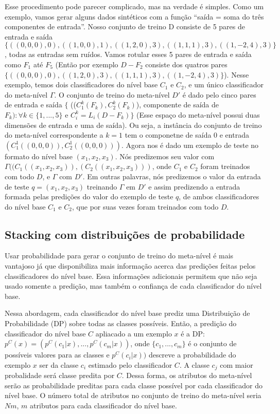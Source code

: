 \documentclass[]{article}
\begin{document}
Esse procedimento pode parecer complicado, mas na verdade é simples.
Como um exemplo, vamos gerar alguns dados sintéticos com a função
``saída = soma do três componentes de entrada''. Nosso conjunto de
treino D consiste de 5 pares de entrada e saída
\(\{((0,0,0),0), ((1,0,0),1), ((1,2,0),3), ((1,1,1),3), ((1,-2,4),3)\}\),
todas as entradas sem ruídos. Vamos rotular esses 5 pares de entrada e
saída como \(F_1\) até \(F_5\) (Então por exemplo \(D - F_2\) consiste
dos quatros pares
\(\{((0,0,0),0), ((1,2,0),3), ((1,1,1),3), ((1,-2,4),3)\}\)). Nesse
exemplo, temos dois classificadores do nível base \(C_1\) e \(C_2\), e
um único classificador do meta-nível \(\Gamma\). O conjunto de treino do
meta-nível \(D'\) é dado pelo cinco pares de entrada e saída \(\{\)
((\(C_1^k(F_k), C_2^k(F_k)\)), componente de saída de
\(F_k) : \forall k \in \{1,...,5\}\) e \(C_i^k = L_i(D-F_k)\}\) (Esse
espaço do meta-nível possui duas dimensões de entrada e uma de saída).
Ou seja, a instância do conjunto de treino do meta-nível correspondente
a \(k = 1\) tem o componetne de saída 0 e entrada
\((C_1^1((0,0,0)), C_2^1((0,0,0)))\). Agora nos é dado um exemplo de
teste no formato do nível base \((x_1, x_2, x_3)\). Nós predizemos seu
valor com \(\Gamma((C_1((x_1, x_2, x_3)), (C_2((x_1, x_2, x_3)))\), onde
\(C_1\) e \(C_2\) foram treinados com todo \(D\), e \(\Gamma\) com
\(D'\). Em outras palavras, nós predizemos o valor da entrada de teste
\(q = (x_1, x_2, x_3)\) treinando \(\Gamma\) em \(D'\) e assim
predizendo a entrada formada pelas predições do valor do exemplo de
teste \(q\), de ambos classificadores do nível base \(C_1\) e \(C_2\),
que por suas vezes foram treinados com todo \(D\).

\subsection{Stacking com distribuições de
probabilidade}\label{stacking-com-distribuicoes-de-probabilidade}

Usar probabilidade para gerar o conjunto de treino do meta-nível é mais
vantajoso já que disponibiliza mais informação acerca das predições
feitas pelos classificadores do nível base. Essa informações adicionais
permitem que não seja usado somente a predição, mas também o confiança
de cada classificador do nível base.

Nessa abordagem, cada classificador do nível base prediz uma
Distribuição de Probabilidade (DP) sobre todas as classes possíveis.
Então, a predição do classificador do nível base \(C\) apliacado a um
exemplo \(x\) é a DP: \(p^C(x) = (p^C(c_1|x), ... , p^C(c_m|x))\), onde
\(\{c_1, ..., c_m\}\) é o conjunto de possíveis valores para as classes
e \(p^C(c_i|x))\) descreve a probabilidade do exemplo \(x\) ser da
classe \(c_i\) estimado pelo classificador \(C\). A classe \(c_j\) com
maior probalidade será classe predita por \(C\). Dessa forma, os
atributos do meta-nível serão as probabilidade preditas para cada classe
possível por cada classificador do nível base. O número total de
atributos no conjunto de treino do meta-nível seria \(Nm\), \(m\)
atributos para cada classificador do nível base.
\end{document}
